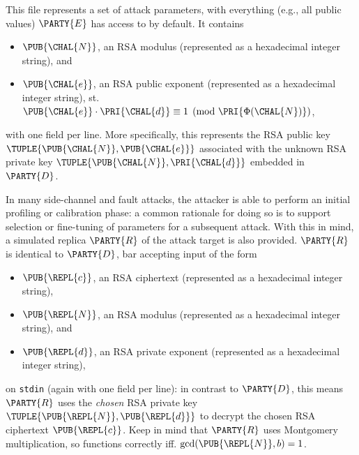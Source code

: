 
This file represents a set of attack parameters, with everything (e.g.,
all public values) $\PARTY{E}$ has access to by default.  It contains 

\begin{itemize}
\item $\PUB{\CHAL{N}}$,
      an RSA modulus
      (represented as a                   hexadecimal integer string),
      and
\item $\PUB{\CHAL{e}}$,
      an RSA public exponent
      (represented as a                   hexadecimal integer string),
      st. $\PUB{\CHAL{e}} \cdot \PRI{\CHAL{d}} \equiv 1 \pmod{\PRI{\Phi(\CHAL{N})}}$,
\end{itemize}

\noindent
with one field per line.
More specifically, this represents the RSA public key 
$
\TUPLE{ \PUB{\CHAL{N}}, \PUB{\CHAL{e}} }
$
associated with the unknown RSA private key 
$
\TUPLE{ \PUB{\CHAL{N}}, \PRI{\CHAL{d}} } 
$
embedded in $\PARTY{D}$.


In many side-channel and fault attacks, the attacker is able to perform an 
initial profiling or calibration phase: a common rationale for doing so is 
to support selection or fine-tuning of parameters for a subsequent attack.  
With this in mind, a simulated replica $\PARTY{R}$ of the attack target is 
also provided.
$\PARTY{R}$ is identical to $\PARTY{D}$, bar accepting input of the form

\begin{itemize}
\item $\PUB{\REPL{c}}$,
      an RSA ciphertext
      (represented as a                   hexadecimal integer string),
\item $\PUB{\REPL{N}}$,
      an RSA modulus
      (represented as a                   hexadecimal integer string),
      and
\item $\PUB{\REPL{d}}$,
      an RSA private exponent
      (represented as a                   hexadecimal integer string),
\end{itemize}

\noindent
on \lstinline[language={bash}]{stdin} (again with one field per line):
in contrast to $\PARTY{D}$, this means $\PARTY{R}$ uses the
{\em chosen} RSA private key $\TUPLE{ \PUB{\REPL{N}}, \PUB{\REPL{d}} }$ 
to decrypt the
     chosen  RSA  ciphertext $\PUB{\REPL{c}}$.
Keep in mind that $\PARTY{R}$ uses Montgomery multiplication, so functions
correctly iff. $\gcd( \PUB{\REPL{N}}, b ) = 1$.

